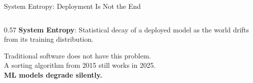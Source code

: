 \documentclass[aspectratio=169, 12pt]{beamer}
\begin{document}
\begin{frame}{System Entropy: Deployment Is Not the End}
\note{
%
%
%
%
%
}

\footnotesize
\begin{columns}[T]
  \begin{column}{0.57\textwidth}
    \textbf{System Entropy}: Statistical decay of a deployed model as the world drifts from its training distribution.

    \vspace{0.1cm}
    Traditional software does not have this problem.\\
    A sorting algorithm from 2015 still works in 2025.\\[0.05cm]
    \textcolor{errorstroke}{\textbf{ML models degrade silently.}}


\end{column}
\end{columns}
\end{frame}
\end{document}
